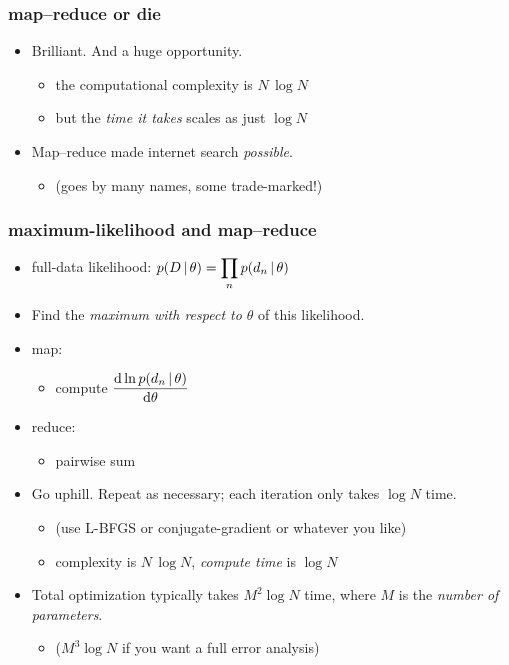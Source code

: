 \documentclass[pdftex]{beamer}
\begin{document}
\begin{frame}
  \frametitle{map--reduce or die}
  \begin{itemize}
  \item Brilliant.  And a huge opportunity.
    \begin{itemize}
    \item the computational complexity is $N\,\log N$
    \item but the \emph{time it takes} scales as just $\log N$
    \end{itemize}
  \item Map--reduce made internet search \emph{possible}.
    \begin{itemize}
    \item (goes by many names, some trade-marked!)
    \end{itemize}
  \end{itemize}
\end{frame}

\begin{frame}
  \frametitle{maximum-likelihood and map--reduce}
  \begin{itemize}
  \item full-data likelihood: $\displaystyle p(D\,|\,\theta) =
    \prod_n p(d_n\,|\,\theta)$
  \item Find the \emph{maximum with respect to $\theta$} of this
    likelihood.
  \item map:
    \begin{itemize}
    \item compute $\displaystyle\frac{\mathrm{d} \ln p(d_n\,|\,\theta)}{\mathrm{d}\theta}$
    \end{itemize}
  \item reduce:
    \begin{itemize}
    \item pairwise sum
    \end{itemize}
  \item Go uphill.  Repeat as necessary; each iteration only takes
    $\log N$ time.
    \begin{itemize}
    \item (use L-BFGS or conjugate-gradient or whatever you like)
    \item complexity is $N\,\log N$, \emph{compute time} is $\log N$
    \end{itemize}
  \item Total optimization typically takes $M^2\log N$ time, where $M$ is the \emph{number of parameters}.
    \begin{itemize}
    \item ($M^3\log N$ if you want a full error analysis)
    \end{itemize}
  \end{itemize}
\end{frame}
\end{document}
